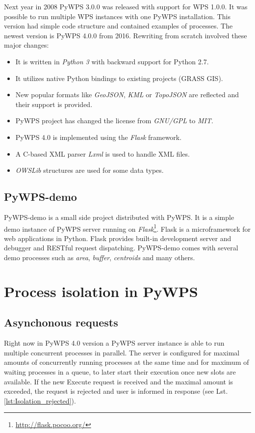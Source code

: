 \documentclass{gifce}
\begin{document}
Next year in 2008 PyWPS 3.0.0 was released with support for WPS 1.0.0. It was possible to run multiple WPS instances
with one PyWPS installation. This version had simple code structure and contained examples of processes. 
The newest version is PyWPS 4.0.0 from 2016. Rewriting from scratch involved these major changes:
\begin{itemize}
\item It is written in \textit{Python 3} with backward support for Python 2.7.
\item It utilizes native Python bindings to existing projects (GRASS GIS).
\item New popular formats like \textit{GeoJSON}, \textit{KML} or \textit{TopoJSON} are reflected and their support is provided.
\item PyWPS project has changed the license from \textit{GNU/GPL} to \textit{MIT}.
\item PyWPS 4.0 is implemented using the \textit{Flask} framework.
\item A C-based XML parser \textit{Lxml} is used to handle XML files.
\item \textit{OWSLib} structures are used for some data types.
\end{itemize}

\subsection{PyWPS-demo}
PyWPS-demo is a small side project distributed with PyWPS. It is a simple demo instance of PyWPS server running on 
\textit{Flask}\footnote{\url{http://flask.pocoo.org/}}. Flask is a microframework for web applications in Python. 
Flask provides built-in development server and debugger and RESTful request dispatching. PyWPS-demo comes with several demo processes such as \textit{area}, \textit{buffer}, \textit{centroids} and many others.

\section{Process isolation in PyWPS}
\subsection{Asynchonous requests}
Right now in PyWPS 4.0 version a PyWPS server instance is able to run
multiple concurrent processes in parallel. The server is configured
for maximal amounts of concurrently running processes at the same time
and for maximum of waiting processes in a queue, to later
start their execution once new slots are available. If the new Execute
request is received and the maximal amount is exceeded, the request is
rejected and user is informed in response (see
Lst. \ref{lst:Isolation_rejected}).
\end{document}
